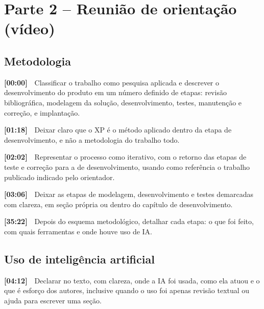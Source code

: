 \documentclass[11pt,a4paper]{article}
\newcommand{\tm}[1]{\textbf{[#1]}\ \ }
\begin{document}
\section*{Parte 2 -- Reunião de orientação (vídeo)}
\subsection*{Metodologia}
\begin{checklist}
  \item \tm{00:00}Classificar o trabalho como pesquisa aplicada e descrever o desenvolvimento do produto em um número definido de etapas: revisão bibliográfica, modelagem da solução, desenvolvimento, testes, manutenção e correção, e implantação.
  \item \tm{01:18}Deixar claro que o XP é o método aplicado dentro da etapa de desenvolvimento, e não a metodologia do trabalho todo.
  \item \tm{02:02}Representar o processo como iterativo, com o retorno das etapas de teste e correção para a de desenvolvimento, usando como referência o trabalho publicado indicado pelo orientador.
  \item \tm{03:06}Deixar as etapas de modelagem, desenvolvimento e testes demarcadas com clareza, em seção própria ou dentro do capítulo de desenvolvimento.
  \item \tm{35:22}Depois do esquema metodológico, detalhar cada etapa: o que foi feito, com quais ferramentas e onde houve uso de IA.
\end{checklist}
\subsection*{Uso de inteligência artificial}
\begin{checklist}
  \item \tm{04:12}Declarar no texto, com clareza, onde a IA foi usada, como ela atuou e o que é esforço dos autores, inclusive quando o uso foi apenas revisão textual ou ajuda para escrever uma seção.
\end{checklist}
\end{document}
